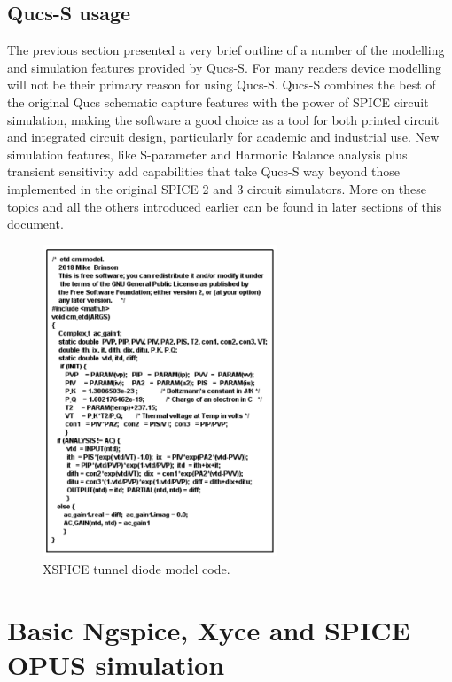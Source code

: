\documentclass[10pt, a4paper]{report}
\begin{document}
\section{Qucs-S usage}
The previous section presented a very brief outline of a number of the modelling and simulation features provided by Qucs-S.  For many readers device modelling will not be their primary reason for using Qucs-S. Qucs-S combines the best of the original Qucs schematic capture features with the power of SPICE circuit simulation, making the software a good choice as a tool for both printed circuit and integrated circuit design, particularly for academic and industrial use.  New simulation features, like S-parameter and Harmonic Balance analysis plus transient sensitivity add capabilities that take Qucs-S way beyond those implemented in the original SPICE 2 and 3 circuit simulators.  More on these topics and all the others introduced earlier can be found in later sections of this document.
\begin{figure}[ht]
	\centering
	\includegraphics[width=7cm]{pics/chap1/Qucs-S-CH1-Fig7.pdf}
	\caption{XSPICE tunnel diode model code.}
	\label{FigCH1-7}
\end{figure}

\newpage
\chapter{Basic Ngspice, Xyce and SPICE OPUS simulation}
\end{document}
